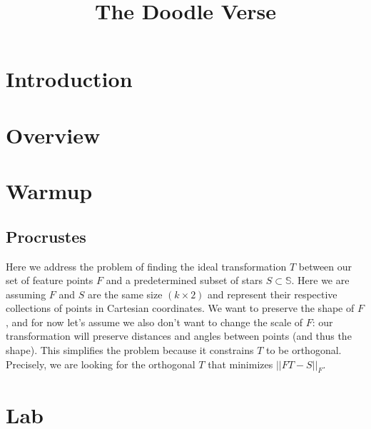 \documentclass[paper=a4, fontsize=11pt]{scrartcl} %
\title{
\normalfont \normalsize
\huge The Doodle Verse \\ %
}
\date{}
\begin{document}
\maketitle

\section{Introduction}

\section{Overview}

\section{Warmup}

\subsection{Procrustes}
Here we address the problem of finding the ideal transformation $T$ between our set of feature points $F$ and a predetermined subset of stars $S\subset \mathbb{S}$. Here we are assuming $F$ and $S$ are the same size $(k\times2)$ and represent their respective collections of points in Cartesian coordinates. We want to preserve the shape of $F$, and for now let's assume we also don't want to change the scale of $F$: our transformation will preserve distances and angles between points (and thus the shape). This simplifies the problem because it constrains $T$ to be orthogonal. Precisely, we are looking for the orthogonal $T$ that minimizes $||FT-S||_F$.

\section{Lab}
\end{document}

